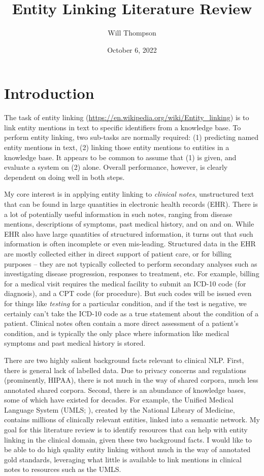 \documentclass{article}
\title{Entity Linking Literature Review }
\author{Will Thompson}
\date{October 6, 2022}
\begin{document}
\maketitle

\section{Introduction}

The task of {entity linking} (\url{https://en.wikipedia.org/wiki/Entity_linking}) is to link entity mentions in text to specific identifiers from a knowledge base. To perform entity linking, two sub-tasks are normally required: (1) predicting named entity mentions in text, (2) linking those entity mentions to entities in a knowledge base. It appears to be common to assume that (1) is given, and evaluate a system on (2) alone. Overall performance, however, is clearly dependent on doing well in both steps.

My core interest is in applying entity linking to \emph{clinical notes}, unstructured text that can be found in large quantities in electronic health records (EHR). There is a lot of potentially useful information in such notes, ranging from disease mentions, descriptions of symptoms, past medical history, and on and on. While EHR also have large quantities of structured information, it turns out that such information is often incomplete or even mis-leading. Structured data in the EHR are mostly collected either in direct support of patient care, or for billing purposes -- they are not typically collected to perform secondary analyses such as investigating disease progression, responses to treatment, etc. For example, billing for a medical visit requires the medical facility to submit an ICD-10 code (for diagnosis), and a CPT code (for procedure). But such codes will be issued even for things like \emph{testing} for a particular condition, and if the test is negative, we certainly can't take the ICD-10 code as a true statement about the condition of a patient. Clinical notes often contain a more direct assessment of a patient's condition, and is typically the only place where information like medical symptoms and past medical history is stored.

There are two highly salient background facts relevant to clinical NLP. First, there is general lack of labelled data. Due to privacy concerns and regulations (prominently, HIPAA), there is not much in the way of shared corpora, much less annotated shared corpora. Second, there is an abundance of knowledge bases, some of which have existed for decades. For example, the Unified Medical Language System (UMLS; \cite{bodenreider_unified_2004}), created by the National Library of Medicine, contains millions of clinically relevant entities, linked into a semantic network. My goal for this literature review is to identify resources that can help with entity linking in the clinical domain, given these two background facts. I would like to be able to do high quality entity linking without much in the way of annotated gold standards, leveraging what little is available to link mentions in clinical notes to resources such as the UMLS.
\end{document}
